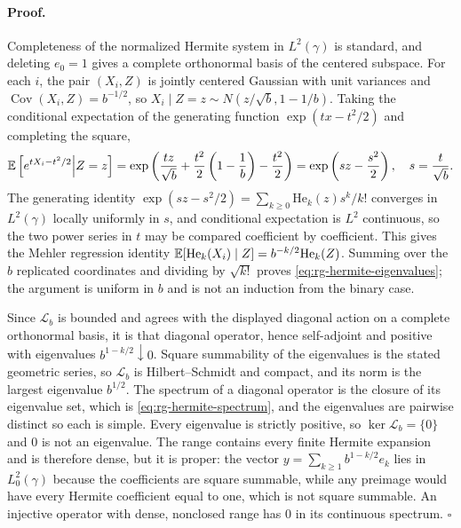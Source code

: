 \paragraph{Proof.}
Completeness of the normalized Hermite system in \(L^2(\gamma)\) is standard,
and deleting \(e_0=1\) gives a complete orthonormal basis of the centered
subspace.  For each \(i\), the pair \((X_i,Z)\) is jointly centered Gaussian
with unit variances and \(\operatorname{Cov}(X_i,Z)=b^{-1/2}\), so
\(X_i\mid Z=z\sim N(z/\sqrt b,1-1/b)\).  Taking the conditional expectation of
the generating function \(\exp(tx-t^2/2)\) and completing the square,
\begin{equation}
 \mathbb E\left[e^{tX_i-t^2/2} \middle| Z=z\right]
 =\exp\left(\frac{tz}{\sqrt b}+\frac{t^2}2\left(1-\frac1b\right)
 -\frac{t^2}2\right)
 =\exp\left(sz-\frac{s^2}2\right),
 \quad s=\frac t{\sqrt b}.
 \label{eq:rg-mehler-generating}
\end{equation}
The generating identity
\(\exp(sz-s^2/2)=\sum_{k\geq0}\mathrm{He}_k(z)s^k/k!\) converges in
\(L^2(\gamma)\) locally uniformly in \(s\), and conditional expectation is
\(L^2\) continuous, so the two power series in \(t\) may be compared coefficient
by coefficient.  This gives the Mehler regression identity
\(\mathbb E[\mathrm{He}_k(X_i)\mid Z]=b^{-k/2}\mathrm{He}_k(Z)\).  Summing over the
\(b\) replicated coordinates and dividing by \(\sqrt{k!}\) proves
\eqref{eq:rg-hermite-eigenvalues}; the argument is uniform in \(b\) and is not an
induction from the binary case.

Since \(\mathscr L_b\) is bounded and agrees with the displayed diagonal action
on a complete orthonormal basis, it is that diagonal operator, hence
self-adjoint and positive with eigenvalues \(b^{1-k/2}\downarrow0\).  Square
summability of the eigenvalues is the stated geometric series, so
\(\mathscr L_b\) is Hilbert--Schmidt and compact, and its norm is the largest
eigenvalue \(b^{1/2}\).  The spectrum of a diagonal operator is the closure of
its eigenvalue set, which is \eqref{eq:rg-hermite-spectrum}, and the eigenvalues
are pairwise distinct so each is simple.  Every eigenvalue is strictly positive,
so \(\ker\mathscr L_b=\{0\}\) and \(0\) is not an eigenvalue.  The range contains
every finite Hermite expansion and is therefore dense, but it is proper: the
vector \(y=\sum_{k\geq1}b^{1-k/2}e_k\) lies in \(L^2_0(\gamma)\) because the
coefficients are square summable, while any preimage would have every Hermite
coefficient equal to one, which is not square summable.  An injective operator
with dense, nonclosed range has \(0\) in its continuous spectrum. \(\square\)

